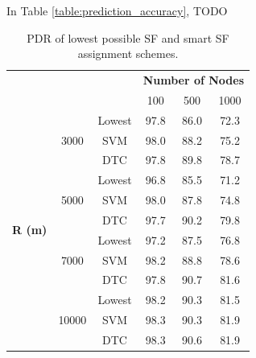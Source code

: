 \documentclass[conference]{IEEEtran}
\begin{document}
\par In Table \ref{table:prediction_accuracy}, TODO

\begin{table}
\centering
\caption{PDR of lowest possible SF and smart SF assignment schemes.}
\label{table:prediction_pdr}
\begin{tabular}{|c|c|c|c|c|c|}
\hline
\multicolumn{3}{|c|}{\multirow{2}{*}{}}                            & \multicolumn{3}{c|}{\textbf{Number of Nodes}} \\ \cline{4-6}
\multicolumn{3}{|c|}{}                                             & 100           & 500           & 1000          \\ \hline
\multirow{12}{*}{\textbf{R (m)}} & \multirow{3}{*}{3000}  & Lowest & 97.8          & 86.0          & 72.3          \\ \cline{3-6}
                                 &                        & SVM    & 98.0          & 88.2          & 75.2          \\ \cline{3-6}
                                 &                        & DTC    & 97.8          & 89.8          & 78.7          \\ \cline{2-6}

                                 & \multirow{3}{*}{5000}  & Lowest & 96.8          & 85.5          & 71.2          \\ \cline{3-6}
                                 &                        & SVM    & 98.0          & 87.8          & 74.8          \\ \cline{3-6}
                                 &                        & DTC    & 97.7          & 90.2          & 79.8          \\ \cline{2-6}

                                 & \multirow{3}{*}{7000}  & Lowest & 97.2          & 87.5          & 76.8          \\ \cline{3-6}
                                 &                        & SVM    & 98.2          & 88.8          & 78.6          \\ \cline{3-6}
                                 &                        & DTC    & 97.8          & 90.7          & 81.6          \\ \cline{2-6}

                                 & \multirow{3}{*}{10000} & Lowest & 98.2          & 90.3          & 81.5          \\ \cline{3-6}
                                 &                        & SVM    & 98.3          & 90.3          & 81.9          \\ \cline{3-6}
                                 &                        & DTC    & 98.3          & 90.6          & 81.9          \\ \hline
\end{tabular}
\end{table}
\end{document}
